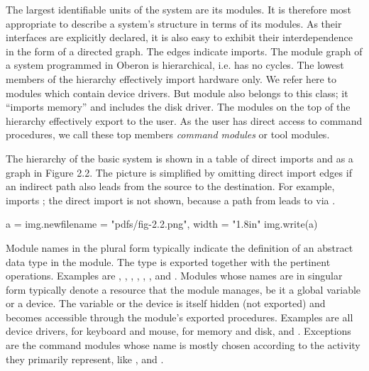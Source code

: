 The largest identifiable units of the system are its modules. It is
therefore most appropriate to describe a system's structure in terms
of its modules. As their interfaces are explicitly declared, it is
also easy to exhibit their interdependence in the form of a directed
graph. The edges indicate imports. The module graph of a system
programmed in Oberon is hierarchical, i.e. has no cycles. The lowest
members of the hierarchy effectively import hardware only. We refer
here to modules which contain device drivers. But module  also
belongs to this class; it ``imports memory'' and includes the disk
driver. The modules on the top of the hierarchy effectively export to
the user. As the user has direct access to command procedures, we call
these top members \emph{command modules} or tool modules.

The hierarchy of the basic system is shown in a table of direct
imports and as a graph in Figure 2.2. The picture is simplified by
omitting direct import edges if an indirect path also leads from the
source to the destination. For example,  imports ; the
direct import is not shown, because a path from  leads to 
via .

\medskip
{} {
  a = img.new{filename = "pdfs/fig-2.2.png", width = "1.8in"}
  img.write(a)
}

{} \medskip


Module names in the plural form typically indicate the definition of
an abstract data type in the module. The type is exported together
with the pertinent operations. Examples are , , , , , , and . Modules whose names are in
singular form typically denote a resource that the module manages, be
it a global variable or a device. The variable or the device is itself
hidden (not exported) and becomes accessible through the module's
exported procedures. Examples are all device drivers, 
for keyboard and mouse,  for memory and disk, and . Exceptions are the command modules whose name is mostly
chosen according to the activity they primarily represent, like , and .

